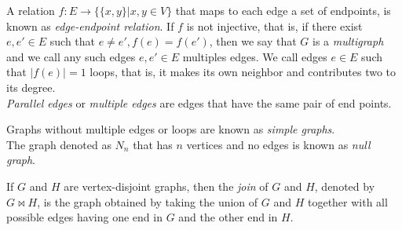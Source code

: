 \documentclass[12pt]{report}
\begin{document}
A relation $f:E\rightarrow \{ \{x,y\}|x,y\in V\}$ that maps to each
edge a set of endpoints, is known as {\em edge-endpoint relation}.
If $f$ is not injective, that is, if there exist $e,e'\in E$ such
that $e\neq e',f(e)=f(e')$, then we say that $G$ is a {\em
multigraph} and we call any such edges $e,e'\in E$ multiples edges.
We call edges $e\in E$ such that $|f(e)|=1$ loops, that is, it makes its own neighbor and contributes two to its degree. \\
{\em Parallel edges} or {\em multiple edges} are edges that have the
same pair of end points.

Graphs without multiple edges or loops are known as {\em simple graphs}.\\
The graph denoted as $N_n$ that has $n$ vertices and no edges is
known as {\em null graph}.

If $G$ and $H$ are vertex-disjoint graphs, then the {\em join} of
$G$ and $H$, denoted by $G\bowtie H$, is the graph obtained by
taking the union of $G$ and $H$ together with all possible edges
having one end in $G$ and the other end in $H$.
\end{document}

